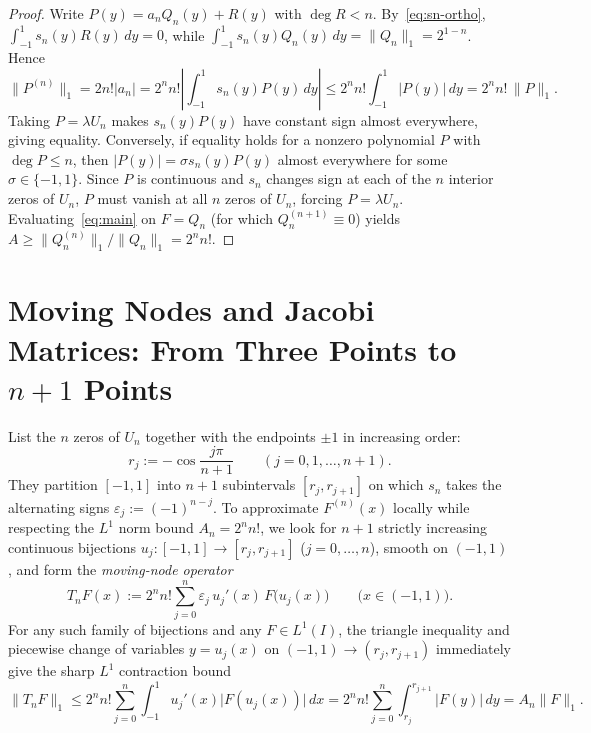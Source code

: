 \documentclass[11pt,a4paper]{article}
\newcommand{\Lone}[1]{\lVert #1\rVert_1}
\theoremstyle{remark}
\numberwithin{equation}{section}
\begin{document}
\begin{proof}
Write $P(y) = a_n Q_n(y) + R(y)$ with $\deg R < n$. By~\eqref{eq:sn-ortho}, $\int_{-1}^{1} s_n(y)R(y)\,dy = 0$, while $\int_{-1}^{1} s_n(y)Q_n(y)\,dy = \Lone{Q_n} = 2^{1-n}$. Hence
\[
    \Lone{P^{(n)}}
    = 2n!|a_n|
    = 2^n n!\left|\int_{-1}^{1} s_n(y)P(y)\,dy\right|
    \le 2^n n!\int_{-1}^{1} |P(y)|\,dy
    = 2^n n!\,\Lone{P}.
\]
Taking $P = \lambda U_n$ makes $s_n(y)P(y)$ have constant sign almost everywhere, giving equality. Conversely, if equality holds for a nonzero polynomial $P$ with $\deg P \le n$, then $|P(y)| = \sigma s_n(y)P(y)$ almost everywhere for some $\sigma \in \{-1, 1\}$. Since $P$ is continuous and $s_n$ changes sign at each of the $n$ interior zeros of $U_n$, $P$ must vanish at all $n$ zeros of $U_n$, forcing $P = \lambda U_n$. Evaluating~\eqref{eq:main} on $F = Q_n$ (for which $Q_n^{(n+1)} \equiv 0$) yields $A \ge \Lone{Q_n^{(n)}}/\Lone{Q_n} = 2^n n!$.
\end{proof}

\section{Moving Nodes and Jacobi Matrices: From Three Points to \texorpdfstring{$n+1$}{n+1} Points}
\label{sec:matrix}

List the $n$ zeros of $U_n$ together with the endpoints $\pm 1$ in increasing order:
\begin{equation}
    r_j := -\cos\frac{j\pi}{n+1} \qquad (j = 0, 1, \dots, n+1).
    \label{eq:rj}
\end{equation}
They partition $[-1,1]$ into $n+1$ subintervals $[r_j, r_{j+1}]$ on which $s_n$ takes the alternating signs $\varepsilon_j := (-1)^{n-j}$. To approximate $F^{(n)}(x)$ locally while respecting the $L^1$ norm bound $A_n = 2^n n!$, we look for $n+1$ strictly increasing continuous bijections $u_j : [-1,1] \to [r_j, r_{j+1}]$ ($j = 0, \dots, n$), smooth on $(-1,1)$, and form the \emph{moving-node operator}
\begin{equation}
    T_n F(x) := 2^n n!\sum_{j=0}^{n} \varepsilon_j\, u_j'(x)\, F\bigl(u_j(x)\bigr)
    \qquad \bigl(x \in (-1,1)\bigr).
    \label{eq:Tn}
\end{equation}
For any such family of bijections and any $F \in L^1(I)$, the triangle inequality and piecewise change of variables $y = u_j(x)$ on $(-1,1) \to (r_j, r_{j+1})$ immediately give the sharp $L^1$ contraction bound
\begin{equation}
    \Lone{T_n F}
    \le 2^n n!\sum_{j=0}^{n}\int_{-1}^{1} u_j'(x)\bigl|F(u_j(x))\bigr|\,dx
    = 2^n n!\sum_{j=0}^{n}\int_{r_j}^{r_{j+1}} |F(y)|\,dy
    = A_n \Lone{F}.
    \label{eq:Tn-bound}
\end{equation}
\end{document}

